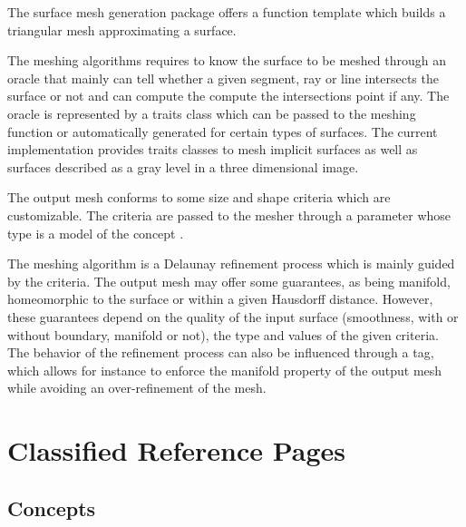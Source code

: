 

The surface mesh generation package offers a function template
which builds a triangular mesh approximating a surface.

The meshing algorithms requires to know the surface to be meshed
through an oracle that mainly can tell whether a
given segment, ray or line  intersects the surface or not
and can compute the compute the
intersections point if any. The oracle is represented by a traits class
which can be passed to the meshing function
or automatically generated for certain types of surfaces.
The current implementation provides 
traits classes 
to mesh implicit surfaces as well as  surfaces described 
as a gray level in a three
dimensional image.
 
The output mesh conforms to some size and shape criteria 
which are customizable. The criteria are passed to the mesher
through a parameter 
whose type is a model of the
concept .

The meshing algorithm is a Delaunay refinement process
which is mainly guided by the criteria. 
The output mesh may offer some guarantees, as being manifold,
homeomorphic to the surface or within a given
Hausdorff distance.  However, these guarantees depend 
on the quality of the input surface (smoothness, with or without
boundary, manifold or  not),
the type and values of the given criteria. 
The behavior of the refinement process can also be influenced through
a tag, which allows for instance to enforce the manifold property
of  the output mesh  while avoiding an over-refinement of the mesh.



\section{Classified Reference Pages}

\subsection*{Concepts}

\\
\\
 \\
 \\
 \\
 \\
 \\
 \\
 \\
 \\


